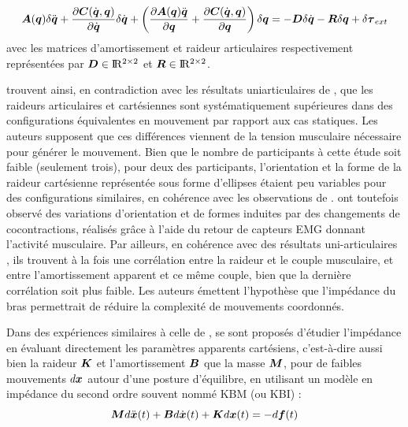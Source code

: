 \begin{equation} \label{eq_gomi_impedance_model}
	\matr{A}(\vect{q}) \delta\ddot{\vect{q}} + \frac{\partial \matr{C}(\dot{\vect{q}},\vect{q})}{\partial \dot{\vect{q}}} \delta\dot{\vect{q}} + \left( \frac{\partial \matr{A}(\vect{q})\ddot{\vect{q}}}{\partial \vect{q}} + \frac{\partial \matr{C}(\dot{\vect{q}},\vect{q})}{\partial \vect{q}} \right) \delta\vect{q} = %
	-\matr{D} \delta\dot{\vect{q}} - \matr{R} \delta\vect{q} + \delta\vect{\tau}_{ext}
\end{equation}
%
avec les matrices d'amortissement et raideur articulaires respectivement représentées par $\matr{D}\in\Re^{2\times2}$ et $\matr{R}\in\Re^{2\times2}$. 

\textcite{gomi_human_1997} trouvent ainsi, en contradiction avec les résultats uniarticulaires de \textcite{bennett_time-varying_1992}, que les raideurs articulaires et cartésiennes sont systématiquement supérieures dans des configurations équivalentes en mouvement par rapport aux cas statiques. Les auteurs supposent que ces différences viennent de la tension musculaire nécessaire pour générer le mouvement. Bien que le nombre de participants à cette étude soit faible (seulement trois), pour deux des participants, l'orientation et la forme de la raideur cartésienne représentée sous forme d'ellipses étaient peu variables pour des configurations similaires, en cohérence avec les observations de \textcite{mussa-ivaldi_neural_1985}. \textcite{gomi_task-dependent_1998} ont toutefois observé des variations d'orientation et de formes induites par des changements de cocontractions, réalisés grâce à l'aide du retour de capteurs EMG donnant l'activité musculaire. Par ailleurs, en cohérence avec des résultats uni-articulaires \parencite{agarwal_compliance_1977}, ils trouvent à la fois une corrélation entre la raideur et le couple musculaire, et entre l'amortissement apparent et ce même couple, bien que la dernière corrélation soit plus faible. Les auteurs émettent l'hypothèse que l'impédance du bras permettrait de réduire la complexité de mouvements coordonnés.

Dans des expériences similaires à celle de \textcite{mussa-ivaldi_neural_1985}, \textcite{tsuji_human_1995, tsuji_human_1997} se sont proposés d'étudier l'impédance en évaluant directement les paramètres apparents cartésiens, c'est-à-dire aussi bien la raideur $\matr{K}$ et l'amortissement $\matr{B}$ que la masse $\matr{M}$, pour de faibles mouvements $d\vect{x}$ autour d'une posture d'équilibre, en utilisant un modèle en impédance du second ordre souvent nommé KBM (ou KBI) :
%
\begin{equation}
	\matr{M}d\ddot{\vect{x}}(t) + \matr{B}d\dot{\vect{x}}(t) + \matr{K}d\vect{x}(t) = - d\vect{f}(t)
\end{equation} 


